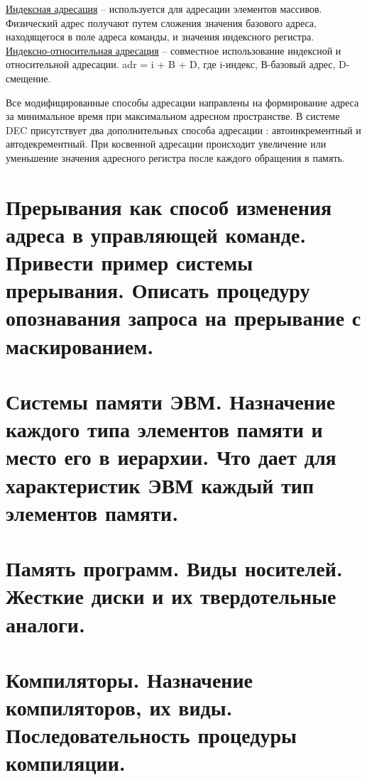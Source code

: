 \documentclass[unicode, 12pt, a4paper, oneside]{article}
\begin{document}
\underline{Индексная адресация} -- используется для адресации элементов массивов. Физический адрес получают путем сложения значения базового адреса, находящегося в поле адреса команды, и значения индексного регистра.\\
\underline{Индексно-относительная адресация} -- совместное использование индексной и относительной адресации. 
adr = i + B + D, где i-индекс, В-базовый адрес, D-смещение.

Все модифицированные способы адресации направлены на формирование адреса за минимальное время при максимальном адресном пространстве. В системе DEC присутствует два дополнительных способа адресации : автоинкрементный и автодекрементный. При косвенной адресации происходит увеличение или уменьшение значения адресного регистра после каждого обращения в память.

\section{Прерывания как способ изменения адреса в управляющей команде. Привести пример системы прерывания. Описать процедуру опознавания запроса на прерывание с маскированием.}

\section{Системы памяти ЭВМ. Назначение каждого типа элементов памяти и место его в иерархии. Что дает для характеристик ЭВМ каждый тип элементов памяти.}

\section{Память программ. Виды носителей. Жесткие диски и их твердотельные аналоги.}

\section{Компиляторы. Назначение компиляторов, их виды. Последовательность процедуры компиляции.}
\end{document}
